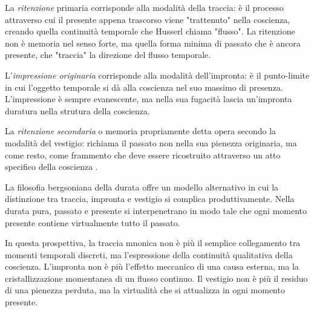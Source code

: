 \documentclass{../../lib/gs}
\begin{document}
La \textit{ritenzione} primaria corrisponde alla modalità della traccia: è il processo attraverso cui il presente appena trascorso viene "trattenuto" nella coscienza, creando quella continuità temporale che Husserl chiama "flusso". La ritenzione non è memoria nel senso forte, ma quella forma minima di passato che è ancora presente, che "traccia" la direzione del flusso temporale.

L'\textit{impressione originaria} corrisponde alla modalità dell'impronta: è il punto-limite in cui l'oggetto temporale si dà alla coscienza nel suo massimo di presenza. L'impressione è sempre evanescente, ma nella sua fugacità lascia un'impronta duratura nella strutura della coscienza.

La \textit{ritenzione secondaria} o memoria propriamente detta opera secondo la modalità del vestigio: richiama il passato non nella sua pienezza originaria, ma come resto, come frammento che deve essere ricostruito attraverso un atto specifico della coscienza \cite{husserl1913}.


La filosofia bergsoniana della durata \cite{bergson1896} offre un modello alternativo in cui la distinzione tra traccia, impronta e vestigio si complica produttivamente. Nella durata pura, passato e presente si interpenetrano in modo tale che ogni momento presente contiene virtualmente tutto il passato.

In questa prospettiva, la traccia mnonica non è più il semplice collegamento tra momenti temporali discreti, ma l'espressione della continuità qualitativa della coscienza. L'impronta non è più l'effetto meccanico di una causa esterna, ma la cristallizzazione momentanea di un flusso continuo. Il vestigio non è più il residuo di una pienezza perduta, ma la virtualità che si attualizza in ogni momento presente.

%
%
%
%
\end{document}
